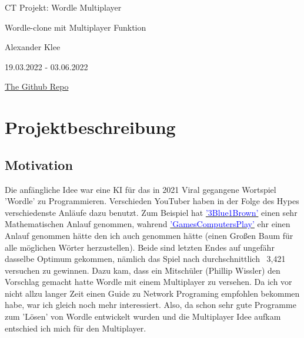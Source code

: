 \documentclass[a4paper]{article}
\begin{document}
    
    \begin{titlepage}
        \begin{center}
            \hspace{0cm}
            \vfill
            
            \Huge
            CT Projekt: Wordle Multiplayer
            
            \vspace{0.3cm}
            
            \Large
            Wordle-clone mit Multiplayer Funktion
            
            \vspace{0.3cm}
            
            \large
            Alexander Klee
            
            \vspace{0.3cm}
            
            19.03.2022 - 03.06.2022
            
            \vspace{0.3cm}
            \href{https://github.com/DarkCypher-37/WordleMultiplayer}{The Github Repo}
            
            \vfill
            \hspace{0cm}
        \end{center}
    \end{titlepage}

    \tableofcontents
    \pagebreak
    
    \section{Projektbeschreibung}
        \subsection{Motivation}
        Die anfängliche Idee war eine KI für das in 2021 Viral gegangene Wortspiel 'Wordle' zu Programmieren. Verschieden YouTuber haben in der Folge des Hypes verschiedenste Anläufe dazu benutzt. Zum Beispiel hat
        \href{https://www.youtube.com/c/3blue1brown}{\textcolor{blue}{'3Blue1Brown'}} 
        einen sehr Mathematischen Anlauf genommen, wahrend
        \href{https://www.youtube.com/c/GamesComputersPlay}{\textcolor{blue}{'GamesComputersPlay'}} 
        ehr einen Anlauf genommen hätte den ich auch genommen hätte (einen Großen Baum für alle möglichen Wörter herzustellen). Beide sind letzten Endes auf ungefähr dasselbe Optimum gekommen, nämlich das Spiel nach durchschnittlich ~3,421 versuchen zu gewinnen.
        \newline
        Dazu kam, dass ein Mitschüler (Phillip Wissler) den Vorschlag gemacht hatte Wordle mit einem Multiplayer zu versehen. Da ich vor nicht allzu langer Zeit einen Guide zu Network Programing empfohlen bekommen habe, war ich gleich noch mehr interessiert. 
        Also, da schon sehr gute Programme zum 'Lösen' von Wordle entwickelt wurden und die Multiplayer Idee aufkam entschied ich mich für den Multiplayer.
        
\end{document}

